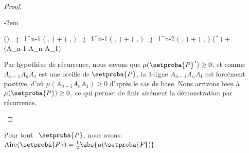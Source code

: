 \begin{proof}
\begin{itemize}
		\leavevmode\kern-2em%
		\begin{stepcalc}[style=ar*]
			\mu()
		\explnext{}
			\dsum_{j=1}^{n-1} \det \big(  ,  \big)
			+
			\det \big(  ,  \big)
		          {}
			\dsum_{j=1}^{n-1} \det \big(  ,  \big)
			+
			\det \big(  ,  \big)
		\explnext{}
			\dsum_{j=1}^{n-2} \det \big(  ,  \big)
			+
			\det \big(  ,  \big)
			\mu(^{\,\prime})
			+
			\mu(A_{n-1} A_n A_1)
		\end{stepcalc}


		\noindent
		Par hypothèse de récurrence, nous savons que
		$\mu(\setproba{P}^{\,\prime}) \geq 0$,
		et comme $A_{n-1} A_n A_1$ est une oreille de $\setproba{P}$, la $3$-ligne $A_{n-1} A_n A_1$ est forcément positive, d'où $\mu(A_{n-1} A_n A_1) \geq 0$ d'après le cas de base.
		Nous arrivons bien à $\mu(\setproba{P}) \geq 0$, ce qui permet de finir aisément la démonstration par récurrence.
	\end{itemize}
\end{proof}




\begin{fact} \label{garea-ngone}
    Pour tout \ngone\ $\setproba{P}$, nous avons:
    $\area{\setproba{P}} = \frac12 \abs{\mu(\setproba{P})}$.
\end{fact}


